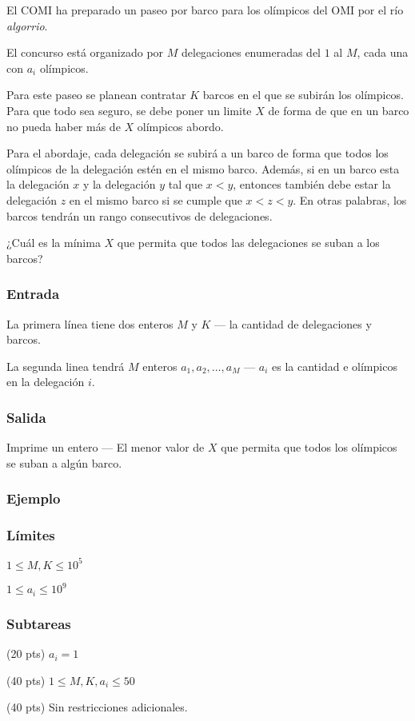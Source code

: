 El COMI ha preparado un paseo por barco para los olímpicos del OMI por el río \textit{algorrio}. 

El concurso está organizado por \(M\) delegaciones enumeradas del \(1\) al \(M\), cada una con \(a_i\) olímpicos.

Para este paseo se planean contratar \(K\) barcos en el que se subirán los olímpicos. Para que todo sea seguro, se debe poner un limite \(X\) de forma de que en un barco no pueda haber más de \(X\)  olímpicos abordo.

Para el abordaje, cada delegación se subirá a un barco de forma que todos los olímpicos de la delegación estén en el mismo barco. Además, si en un barco esta la delegación \(x\) y la delegación \(y\) tal que \(x < y\), entonces también debe estar la delegación \(z\) en el mismo barco si se cumple que \(x < z < y\). En otras palabras, los barcos tendrán un rango consecutivos de delegaciones.

¿Cuál es la mínima \(X\) que permita que todos las delegaciones se suban a los barcos?

\subsubsection*{Entrada}
La primera línea tiene dos enteros \(M\) y \(K\) --- la cantidad de delegaciones y barcos.

La segunda linea tendrá \(M\) enteros \(a_1, a_2, \ldots, a_M\) --- \(a_i\) es la cantidad e olímpicos en la delegación \(i\).

\subsubsection*{Salida}
Imprime un entero --- El menor valor de \(X\) que permita que todos los olímpicos se suban a algún barco.

\subsubsection*{Ejemplo}
\begin{casebox3}
\end{casebox3}
\subsubsection*{Límites}
\begin{plimits}
	\item \(1\leq M, K \leq 10^5\)
	\item \(1\leq a_i \leq 10^9\)
\end{plimits}

\subsubsection*{Subtareas}
\begin{plimits}
	\item (20 pts) \(a_i=1\)
	\item (40 pts) \(1\leq M,K,a_i \leq 50\)
	\item (40 pts) Sin restricciones adicionales.
\end{plimits}

